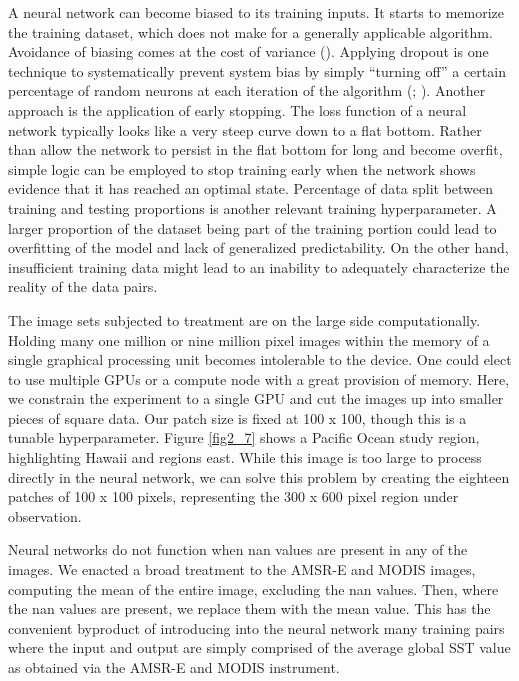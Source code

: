 \begin{refsection}
A neural network can become biased to its training inputs. It starts to memorize the training dataset, which does not make for a generally applicable algorithm. Avoidance of biasing comes at the cost of variance (\cite{geman1992neural}). Applying dropout is one technique to systematically prevent system bias by simply “turning off” a certain percentage of random neurons at each iteration of the algorithm (\cite{hinton2012improving}; \cite{srivastava2014dropout}). Another approach is the application of early stopping. The loss function of a neural network typically looks like a very steep curve down to a flat bottom. Rather than allow the network to persist in the flat bottom for long and become overfit, simple logic can be employed to stop training early when the network shows evidence that it has reached an optimal state. Percentage of data split between training and testing proportions is another relevant training hyperparameter. A larger proportion of the dataset being part of the training portion could lead to overfitting of the model and lack of generalized predictability. On the other hand, insufficient training data might lead to an inability to adequately characterize the reality of the data pairs.

The image sets subjected to treatment are on the large side computationally. Holding many one million or nine million pixel images within the memory of a single graphical processing unit becomes intolerable to the device. One could elect to use multiple GPUs or a compute node with a great provision of memory. Here, we constrain the experiment to a single GPU and cut the images up into smaller pieces of square data. Our patch size is fixed at 100 x 100, though this is a tunable hyperparameter. Figure \ref{fig2_7} shows a Pacific Ocean study region, highlighting Hawaii and regions east. While this image is too large to process directly in the neural network, we can solve this problem by creating the eighteen patches of 100 x 100 pixels, representing the 300 x 600 pixel region under observation. 

Neural networks do not function when nan values are present in any of the images. We enacted a broad treatment to the AMSR-E and MODIS images, computing the mean of the entire image, excluding the nan values. Then, where the nan values are present, we replace them with the mean value. This has the convenient byproduct of introducing into the neural network many training pairs where the input and output are simply comprised of the average global SST value as obtained via the AMSR-E and MODIS instrument.


\end{refsection}
